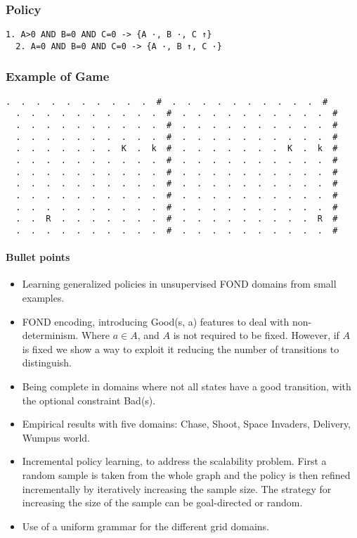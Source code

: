 \documentclass[a4paper]{article}
\begin{document}
\subsubsection{Policy}
\begin{Verbatim}[fontsize=\footnotesize]
  1. A>0 AND B=0 AND C=0 -> {A ·, B ·, C ↑}
  2. A=0 AND B=0 AND C=0 -> {A ·, B ↑, C ·}
\end{Verbatim}

\subsubsection{Example of Game}
\begin{Verbatim}[fontsize=\footnotesize]
  .  .  .  .  .  .  .  .  .  .  #  .  .  .  .  .  .  .  .  .  .  #
  .  .  .  .  .  .  .  .  .  .  #  .  .  .  .  .  .  .  .  .  .  #
  .  .  .  .  .  .  .  .  .  .  #  .  .  .  .  .  .  .  .  .  .  #
  .  .  .  .  .  .  .  .  .  .  #  .  .  .  .  .  .  .  .  .  .  #
  .  .  .  .  .  .  .  K  .  k  #  .  .  .  .  .  .  .  K  .  k  #
  .  .  .  .  .  .  .  .  .  .  #  .  .  .  .  .  .  .  .  .  .  #
  .  .  .  .  .  .  .  .  .  .  #  .  .  .  .  .  .  .  .  .  .  #
  .  .  .  .  .  .  .  .  .  .  #  .  .  .  .  .  .  .  .  .  .  #
  .  .  .  .  .  .  .  .  .  .  #  .  .  .  .  .  .  .  .  .  .  #
  .  .  .  .  .  .  .  .  .  .  #  .  .  .  .  .  .  .  .  .  .  #
  .  .  R  .  .  .  .  .  .  .  #  .  .  .  .  .  .  .  .  .  R  #
  .  .  .  .  .  .  .  .  .  .  #  .  .  .  .  .  .  .  .  .  .  #
\end{Verbatim}

\newpage

\paragraph{Bullet points}
\begin{itemize}
\item Learning generalized policies in unsupervised FOND domains from small examples.
\item FOND encoding, introducing Good(s, a) features to deal with non-determinism. Where $a \in A$, and $A$ is not required to be fixed. However, if $A$ is fixed we show a way to exploit it reducing the number of transitions to distinguish.
\item Being complete in domains where not all states have a good transition, with the optional constraint Bad(s).
\item Empirical results with five domains: Chase, Shoot, Space Invaders, Delivery, Wumpus world.
\item Incremental policy learning, to address the scalability problem. First a random sample is taken from the whole graph and the policy is then refined incrementally by iteratively increasing the sample size. The strategy for increasing the size of the sample can be goal-directed or random.
\item Use of a uniform grammar for the different grid domains.
\end{itemize}




\end{document}
